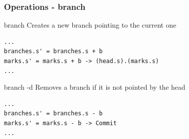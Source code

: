 \documentclass{beamer}
\begin{document}
\begin{frame}[fragile]
   \frametitle{Operations - branch}
   \begin{block}{branch}
      Creates a new branch pointing to the current one
   \end{block}
   \tiny
   \begin{lstlisting}
...
branches.s' = branches.s + b
marks.s' = marks.s + b -> (head.s).(marks.s)
...
   \end{lstlisting}
   \normalsize
   \begin{block}{branch -d}
      Removes a branch if it is not pointed by the head
   \end{block}
   \tiny
   \begin{lstlisting}
...
branches.s' = branches.s - b
marks.s' = marks.s - b -> Commit
...
   \end{lstlisting}
\end{frame}
\end{document}
